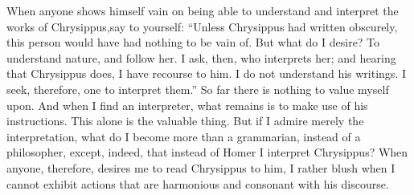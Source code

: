 When anyone shows himself vain on being able to understand and interpret
the works of Chrysippus,\footnotemark say to yourself: ``Unless Chrysippus had
written obscurely, this person would have had nothing to be vain of. But
what do I desire? To understand nature, and follow her. I ask, then, who
interprets her; and hearing that Chrysippus does, I have recourse to him.
I do not understand his writings. I seek, therefore, one to interpret
them.'' So far there is nothing to value myself upon. And when I find an
interpreter, what remains is to make use of his instructions. This alone
is the valuable thing. But if I admire merely the interpretation, what do
I become more than a grammarian, instead of a philosopher, except,
indeed, that instead of Homer I interpret Chrysippus? When anyone,
therefore, desires me to read Chrysippus to him, I rather blush when I
cannot exhibit actions that are harmonious and consonant with his
discourse.

